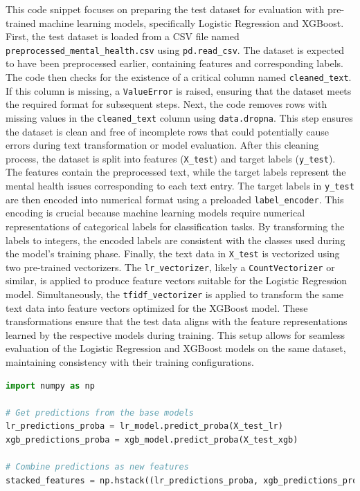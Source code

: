 \noindent
This code snippet focuses on preparing the test dataset for evaluation with pre-trained machine learning models, specifically Logistic Regression and XGBoost. First, the test dataset is loaded from a CSV file named \texttt{preprocessed\_mental\_health.csv} using \texttt{pd.read\_csv}. The dataset is expected to have been preprocessed earlier, containing features and corresponding labels. The code then checks for the existence of a critical column named \texttt{cleaned\_text}. If this column is missing, a \texttt{ValueError} is raised, ensuring that the dataset meets the required format for subsequent steps. Next, the code removes rows with missing values in the \texttt{cleaned\_text} column using \texttt{data.dropna}. This step ensures the dataset is clean and free of incomplete rows that could potentially cause errors during text transformation or model evaluation. After this cleaning process, the dataset is split into features (\texttt{X\_test}) and target labels (\texttt{y\_test}). The features contain the preprocessed text, while the target labels represent the mental health issues corresponding to each text entry. The target labels in \texttt{y\_test} are then encoded into numerical format using a preloaded \texttt{label\_encoder}. This encoding is crucial because machine learning models require numerical representations of categorical labels for classification tasks. By transforming the labels to integers, the encoded labels are consistent with the classes used during the model's training phase. Finally, the text data in \texttt{X\_test} is vectorized using two pre-trained vectorizers. The \texttt{lr\_vectorizer}, likely a \texttt{CountVectorizer} or similar, is applied to produce feature vectors suitable for the Logistic Regression model. Simultaneously, the \texttt{tfidf\_vectorizer} is applied to transform the same text data into feature vectors optimized for the XGBoost model. These transformations ensure that the test data aligns with the feature representations learned by the respective models during training. This setup allows for seamless evaluation of the Logistic Regression and XGBoost models on the same dataset, maintaining consistency with their training configurations.

\begin{tcolorbox}[colback=gray!5!white, colframe=gray!80!black, boxrule=0.5pt, title=Ensemble Model 1 : Combine Base Model Predictions]
\begin{lstlisting}[language=Python]
import numpy as np

# Get predictions from the base models
lr_predictions_proba = lr_model.predict_proba(X_test_lr)
xgb_predictions_proba = xgb_model.predict_proba(X_test_xgb)

# Combine predictions as new features
stacked_features = np.hstack((lr_predictions_proba, xgb_predictions_proba))
\end{lstlisting}
\end{tcolorbox}

